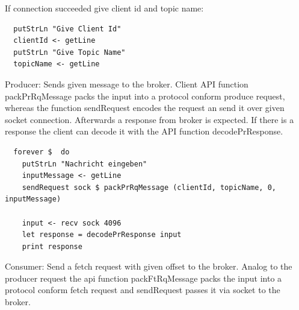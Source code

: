 If connection succeeded give client id and topic name: 
\begin{lstlisting}
  putStrLn "Give Client Id"
  clientId <- getLine
  putStrLn "Give Topic Name"
  topicName <- getLine
\end{lstlisting}

Producer: Sends given message to the broker. Client API function packPrRqMessage
packs the input into a protocol conform produce request, whereas the function
sendRequest encodes the request an send it over given socket connection.
Afterwards a response from broker is expected. If there is a response the client
can decode it with the API function decodePrResponse. 
\begin{lstlisting}
  forever $  do 
    putStrLn "Nachricht eingeben"
    inputMessage <- getLine
    sendRequest sock $ packPrRqMessage (clientId, topicName, 0, inputMessage)

    input <- recv sock 4096
    let response = decodePrResponse input
    print response 
\end{lstlisting}

Consumer: Send a fetch request with given offset to the broker. Analog to the producer request 
the api function packFtRqMessage packs the input into a protocol conform fetch request and sendRequest passes it via socket to the broker. 


